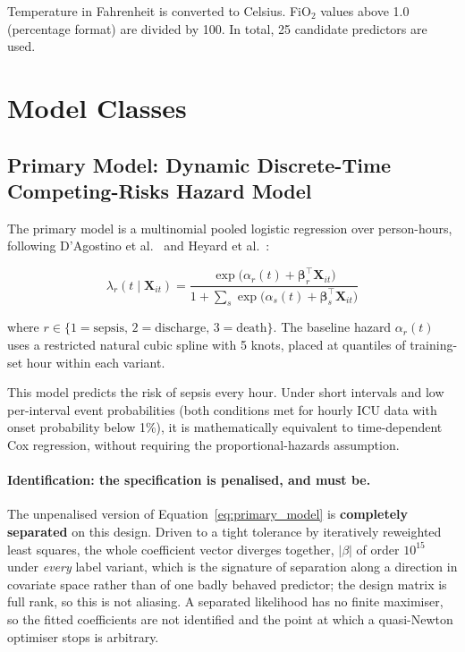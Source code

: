 Temperature in Fahrenheit is converted to Celsius. FiO$_2$ values above 1.0
(percentage format) are divided by 100. In total, 25 candidate predictors are
used.


\section{Model Classes}
\label{sec:models}

\subsection{Primary Model: Dynamic Discrete-Time Competing-Risks Hazard Model}
\label{sec:primary_model_spec}

The primary model is a multinomial pooled logistic regression over person-hours,
following D'Agostino et al.\ \cite{dagostino1990pooled} and Heyard et al.\
\cite{heyard2019dynamic}:

\begin{equation}
    \lambda_r(t \mid \mathbf{X}_{it}) =
    \frac{\exp\!\bigl(\alpha_r(t) + \boldsymbol{\beta}_r^\top \mathbf{X}_{it}\bigr)}
    {1 + \sum_{s} \exp\!\bigl(\alpha_s(t) + \boldsymbol{\beta}_s^\top \mathbf{X}_{it}\bigr)}
    \label{eq:primary_model}
\end{equation}

where $r \in \{1=\text{sepsis},\, 2=\text{discharge},\, 3=\text{death}\}$.
The baseline hazard $\alpha_r(t)$ uses a restricted natural cubic spline with
5 knots, placed at quantiles of training-set hour within each variant.

This model predicts the risk of sepsis every hour. Under short intervals
and low per-interval event probabilities (both conditions met for hourly ICU
data with onset probability below 1\%), it is mathematically equivalent to
time-dependent Cox regression, without requiring the proportional-hazards
assumption.

\paragraph{Identification: the specification is penalised, and must be.}
The unpenalised version of Equation~\eqref{eq:primary_model} is
\textbf{completely separated} on this design. Driven to a tight tolerance by
iteratively reweighted least squares, the whole coefficient vector diverges
together, $|\beta|$ of order $10^{15}$ under \emph{every} label variant,
which is the signature of separation along a direction in covariate space rather
than of one badly behaved predictor; the design matrix is full rank, so this is
not aliasing. A separated likelihood has no finite maximiser, so the fitted
coefficients are not identified and the point at which a quasi-Newton optimiser
stops is arbitrary.

